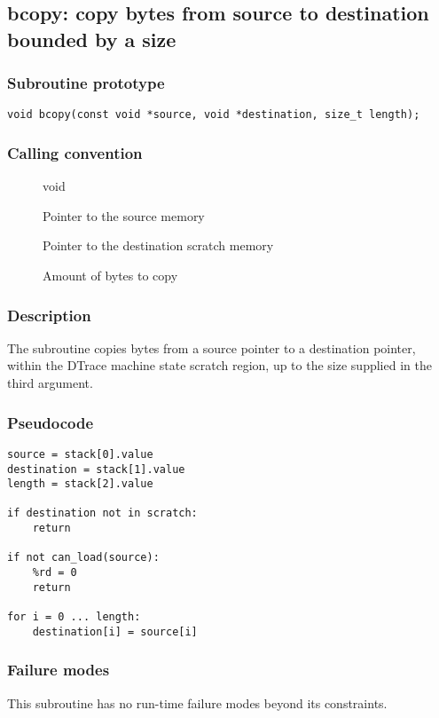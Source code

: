 \clearpage
{}
{}
\label{subr:bcopy}
\subsection*{bcopy: copy bytes from source to destination bounded by a
size}

\subsubsection*{Subroutine prototype}

\begin{verbatim}
void bcopy(const void *source, void *destination, size_t length);
\end{verbatim}

\subsubsection*{Calling convention}

\begin{description}
\item[] void
\item[] Pointer to the source memory
\item[] Pointer to the destination scratch memory
\item[] Amount of bytes to copy
\end{description}

\subsubsection*{Description}

The  subroutine copies bytes from a source pointer
to a destination pointer, within the DTrace machine state scratch
region, up to the size supplied in the third argument.
\subsubsection*{Pseudocode}

\begin{verbatim}
source = stack[0].value
destination = stack[1].value
length = stack[2].value

if destination not in scratch:
    return

if not can_load(source):
    %rd = 0
    return

for i = 0 ... length:
    destination[i] = source[i]
\end{verbatim}

\subsubsection*{Failure modes}

This subroutine has no run-time failure modes beyond its constraints.

